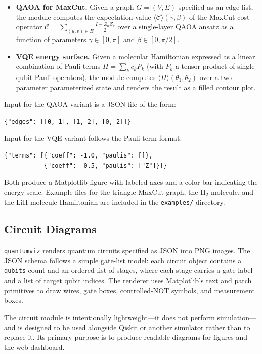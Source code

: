 \documentclass{SciPost}
\begin{document}
\begin{itemize}
  \item \textbf{QAOA for MaxCut.}
    Given a graph $G = (V, E)$ specified as an edge list, the module computes
    the expectation value $\langle \mathcal{C}\rangle(\gamma,\beta)$ of the
    MaxCut cost operator
    $\mathcal{C} = \sum_{(u,v)\in E}\frac{I - Z_u Z_v}{2}$
    over a single-layer QAOA ansatz as a function of parameters
    $\gamma \in [0,\pi]$ and $\beta \in [0,\pi/2]$.

  \item \textbf{VQE energy surface.}
    Given a molecular Hamiltonian expressed as a linear combination of Pauli
    terms $H = \sum_k c_k P_k$ (with $P_k$ a tensor product of single-qubit
    Pauli operators), the module computes
    $\langle H\rangle(\theta_1,\theta_2)$ over a two-parameter parameterized
    state and renders the result as a filled contour plot.
\end{itemize}

Input for the QAOA variant is a JSON file of the form:
\begin{lstlisting}
{"edges": [[0, 1], [1, 2], [0, 2]]}
\end{lstlisting}

Input for the VQE variant follows the Pauli term format:
\begin{lstlisting}
{"terms": [{"coeff": -1.0, "paulis": []},
           {"coeff":  0.5, "paulis": ["Z"]}]}
\end{lstlisting}

Both produce a Matplotlib figure with labeled axes and a color bar indicating
the energy scale.
Example files for the triangle MaxCut graph, the H$_2$ molecule, and the LiH
molecule Hamiltonian are included in the \texttt{examples/} directory.

\subsection{Circuit Diagrams}

\texttt{quantumviz} renders quantum circuits specified as JSON into PNG
images.
The JSON schema follows a simple gate-list model: each circuit object contains
a \texttt{qubits} count and an ordered list of stages, where each stage
carries a gate label and a list of target qubit indices.
The renderer uses Matplotlib's text and patch primitives to draw wires, gate
boxes, controlled-NOT symbols, and measurement boxes.

The circuit module is intentionally lightweight---it does not perform
simulation---and is designed to be used alongside Qiskit or another simulator
rather than to replace it.
Its primary purpose is to produce readable diagrams for figures and the web
dashboard.
\end{document}
